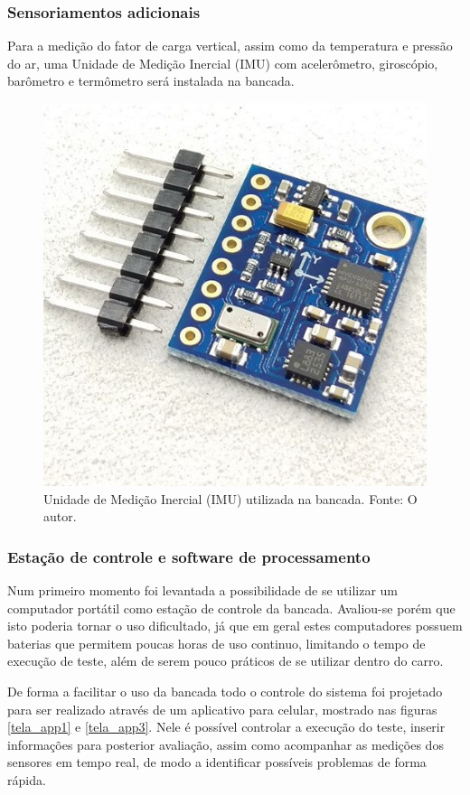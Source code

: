 \subsubsection{Sensoriamentos adicionais}

Para a medição do fator de carga vertical, assim como da temperatura e pressão do ar, uma Unidade de Medição Inercial (IMU) com acelerômetro, giroscópio, barômetro e termômetro será instalada na bancada.

\begin{figure}[!ht]
    \centering
    \includegraphics[width=.5\linewidth]{figuras/internet/IMU.jpg}
    \caption{Unidade de Medição Inercial (IMU) utilizada na bancada. Fonte: O autor.}
    \label{fig:imu}
\end{figure}

\subsubsection{Estação de controle e software de processamento}

Num primeiro momento foi levantada a possibilidade de se utilizar um computador portátil como estação de controle da bancada. Avaliou-se porém que isto poderia tornar o uso dificultado, já que em geral estes computadores possuem baterias que permitem poucas horas de uso continuo, limitando o tempo de execução de teste, além de serem pouco práticos de se utilizar dentro do carro.

De forma a facilitar o uso da bancada todo o controle do sistema foi projetado para ser realizado através de um aplicativo para celular, mostrado nas figuras \ref{tela_app1} e \ref{tela_app3}. Nele é possível controlar a execução do teste, inserir informações para posterior avaliação, assim como acompanhar as medições dos sensores em tempo real, de modo a identificar possíveis problemas de forma rápida.

